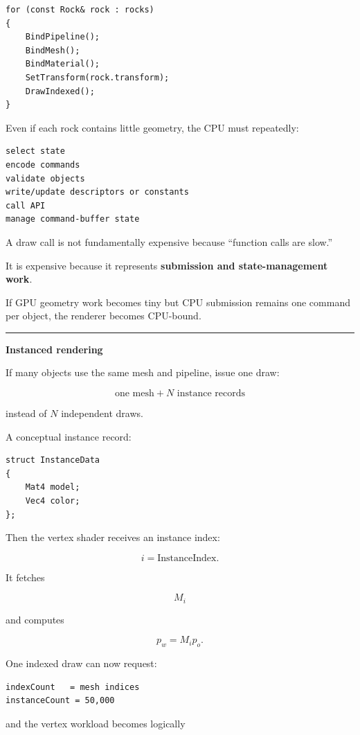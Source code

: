 \begin{verbatim}
for (const Rock& rock : rocks)
{
    BindPipeline();
    BindMesh();
    BindMaterial();
    SetTransform(rock.transform);
    DrawIndexed();
}
\end{verbatim}

Even if each rock contains little geometry, the CPU must repeatedly:

\begin{verbatim}
select state
encode commands
validate objects
write/update descriptors or constants
call API
manage command-buffer state
\end{verbatim}

A draw call is not fundamentally expensive because ``function calls are slow.''

It is expensive because it represents \textbf{submission and state-management work}.

If GPU geometry work becomes tiny but CPU submission remains one command per object, the renderer becomes CPU-bound.

\begin{center}\rule{0.5\linewidth}{0.5pt}\end{center}

\textbf{Instanced rendering}

If many objects use the same mesh and pipeline, issue one draw:

\[
\boxed{
\text{one mesh}
+
N\text{ instance records}
}
\]

instead of \(N\) independent draws.

A conceptual instance record:

\begin{verbatim}
struct InstanceData
{
    Mat4 model;
    Vec4 color;
};
\end{verbatim}

Then the vertex shader receives an instance index:

\[
i=\text{InstanceIndex}.
\]

It fetches

\[
M_i
\]

and computes

\[
p_w=M_i p_o.
\]

One indexed draw can now request:

\begin{verbatim}
indexCount   = mesh indices
instanceCount = 50,000
\end{verbatim}

and the vertex workload becomes logically

